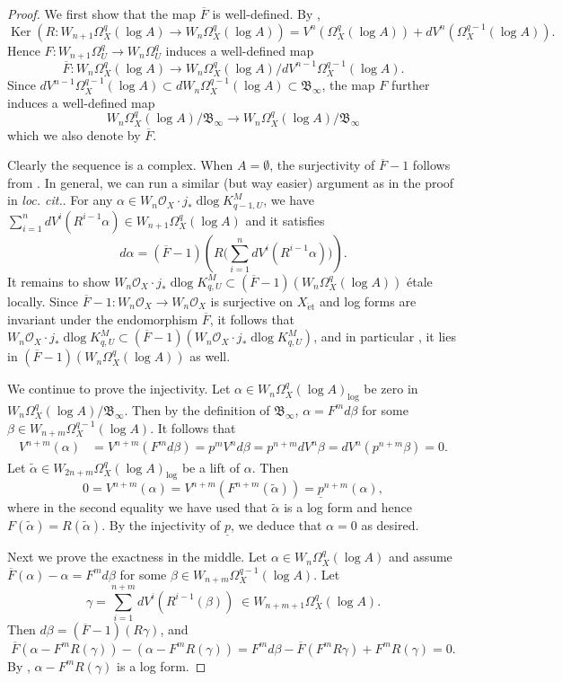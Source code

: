 \documentclass[11pt]{amsart}
\newcommand{\ra}{\rightarrow}
\newcommand{\sB}{\mathfrak{B}}
\newcommand{\cO}{\mathcal{O}}
\newcommand{\Ker}{\operatorname{Ker}}
\newcommand{\dlog}{\operatorname{dlog}}
\newcommand{\et}{{\operatorname{\acute{e}t}}}
\newcommand{\ul}{\underline}
\renewcommand{\tilde}{\widetilde}
\renewcommand{\bar}{\overline}
\theoremstyle{plain}
\theoremstyle{definition}
\numberwithin{equation}{prop}
\begin{document}
\begin{proof}
We first show that the map $\bar F$ is well-defined.
By \cite[Theorem 4.4]{HK}, 
$$\Ker(R:W_{n+1}\Omega^q_X(\log A)\ra W_n\Omega^q_X(\log A))
=V^n(\Omega^q_X(\log A))+dV^n(\Omega^{q-1}_X(\log A)).
$$
Hence $F:W_{n+1}\Omega^q_U\ra W_n\Omega^q_U$ induces a well-defined map
$$\bar F: W_n\Omega^q_X(\log A)\ra W_n\Omega^q_X(\log A)/dV^{n-1}\Omega^{q-1}_X(\log A).$$
Since $dV^{n-1}\Omega^{q-1}_X(\log A)\subset dW_n\Omega^{q-1}_X(\log A)\subset \sB_\infty$, the map $F$ further induces a well-defined map
$$W_n\Omega^q_X(\log A)/\sB_\infty\ra W_n\Omega^q_X(\log A)/\sB_\infty$$
which we also denote by $\bar F$.

Clearly the sequence is a complex.
When $A=\emptyset$, the surjectivity of $\bar F-1$  follows from \cite[I, Proposition 3.26]{IlDRW}.
In general, we can run a similar (but way easier) argument as in the proof in \textit{loc. cit.}. 
For any $\alpha\in W_n\cO_X\cdot j_*\dlog K^M_{q-1,U}$, 
we have $\sum_{i=1}^n dV^i(R^{i-1}\alpha)
\in W_{n+1}\Omega^q_X(\log A)$
and it satisfies
$$d\alpha=(\bar F-1)(R\Big(\sum_{i=1}^n dV^i(R^{i-1}\alpha)\Big)).$$
It remains to show $W_n\cO_X\cdot j_*\dlog K^M_{q,U}\subset (\bar F-1)(W_n\Omega^q_X(\log A))$ \'etale locally.
Since $\bar F-1:W_n\cO_X\ra W_n\cO_X$ is surjective on $X_\et$ and log forms are invariant under the endomorphism $\bar F$, 
it follows that $W_n\cO_X\cdot j_*\dlog K^M_{q,U}\subset (\bar F-1)(W_n\cO_X\cdot j_*\dlog K^M_{q,U})$, and in particular , it lies in $ (\bar F-1)(W_n\Omega^q_X(\log A))$ as well.


We continue to prove the injectivity.
Let $\alpha \in W_{n}\Omega^q_{X}(\log A)_{\log}$ be zero in $W_n\Omega^q_X(\log A)/\sB_\infty$. 
Then by the definition of $\sB_\infty$,
$\alpha=F^m d\beta$ for some $\beta\in W_{n+m}\Omega^{q-1}_X(\log A)$.
It follows that 
\begin{align*}
V^{n+m}(\alpha) 
&= V^{n+m}(F^m d\beta) 
=p^mV^n d\beta
= p^{n+m} d V^n \beta 
= dV^n(p^{n+m}\beta)=0.
\end{align*}
Let $\tilde \alpha\in W_{2n+m}\Omega^q_X(\log A)_{\log}$ be a lift of $\alpha$.
Then 
$$0= V^{n+m}(\alpha)= V^{n+m}(F^{n+m}(\tilde \alpha))= \ul p^{n+m}(\alpha),$$
where in the second equality we have used that $\tilde \alpha$ is a log form and hence $F(\tilde \alpha)=R(\tilde \alpha)$.
By the injectivity of $\ul p$, we deduce that $\alpha=0$ as desired.

Next we prove the exactness in the middle.
Let $\alpha\in W_{n}\Omega^q_{X}(\log A)$  and assume  
$\bar F(\alpha)-\alpha = F^m d\beta$
for some $\beta\in W_{n+m}\Omega_X^{q-1}(\log A)$.
Let 
$$\gamma=\sum_{i=1}^{n+m} dV^i(R^{i-1}(\beta))\;\in W_{n+m+1}\Omega^q_X(\log A).$$
Then 
$d\beta=(\bar F-1)(R\gamma)$, and
$$\bar F(\alpha-F^m R(\gamma)) - (\alpha- F^m R(\gamma))=
F^md\beta -\bar F(F^{m}R\gamma)+F^m R(\gamma)
=0.$$
By \cite[Lemme 2]{CTSS}, $\alpha- F^m R(\gamma)$ is a log form.
\end{proof}
\end{document}
